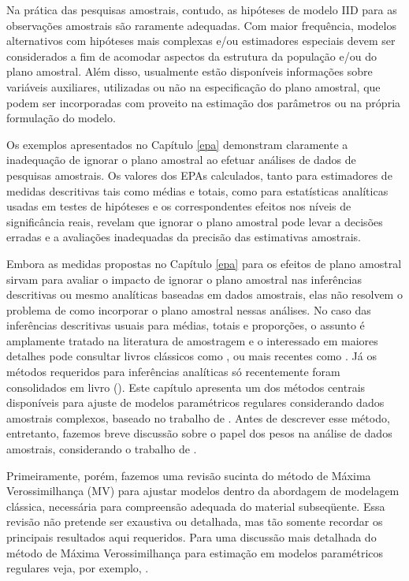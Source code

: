 \documentclass[]{book}
\theoremstyle{definition}
\theoremstyle{definition}
\theoremstyle{definition}
\theoremstyle{remark}
\begin{document}
Na prática das pesquisas amostrais, contudo, as hipóteses de modelo IID
para as observações amostrais são raramente adequadas. Com maior
frequência, modelos alternativos com hipóteses mais complexas e/ou
estimadores especiais devem ser considerados a fim de acomodar aspectos
da estrutura da população e/ou do plano amostral. Além disso, usualmente
estão disponíveis informações sobre variáveis auxiliares, utilizadas ou
não na especificação do plano amostral, que podem ser incorporadas com
proveito na estimação dos parâmetros ou na própria formulação do modelo.

Os exemplos apresentados no Capítulo \ref{epa} demonstram claramente a
inadequação de ignorar o plano amostral ao efetuar análises de dados de
pesquisas amostrais. Os valores dos EPAs calculados, tanto para
estimadores de medidas descritivas tais como médias e totais, como para
estatísticas analíticas usadas em testes de hipóteses e os
correspondentes efeitos nos níveis de significância reais, revelam que
ignorar o plano amostral pode levar a decisões erradas e a avaliações
inadequadas da precisão das estimativas amostrais.

Embora as medidas propostas no Capítulo \ref{epa} para os efeitos de
plano amostral sirvam para avaliar o impacto de ignorar o plano amostral
nas inferências descritivas ou mesmo analíticas baseadas em dados
amostrais, elas não resolvem o problema de como incorporar o plano
amostral nessas análises. No caso das inferências descritivas usuais
para médias, totais e proporções, o assunto é amplamente tratado na
literatura de amostragem e o interessado em maiores detalhes pode
consultar livros clássicos como \citep{cochran}, ou mais recentes como
\citep{SSW92}. Já os métodos requeridos para inferências analíticas só
recentemente foram consolidados em livro (\citep{SHS89}). Este capítulo
apresenta um dos métodos centrais disponíveis para ajuste de modelos
paramétricos regulares considerando dados amostrais complexos, baseado
no trabalho de \citep{binder87}. Antes de descrever esse método,
entretanto, fazemos breve discussão sobre o papel dos pesos na análise
de dados amostrais, considerando o trabalho de \citep{Pfeff}.

Primeiramente, porém, fazemos uma revisão sucinta do método de Máxima
Verossimilhança (MV) para ajustar modelos dentro da abordagem de
modelagem clássica, necessária para compreensão adequada do material
subseqüente. Essa revisão não pretende ser exaustiva ou detalhada, mas
tão somente recordar os principais resultados aqui requeridos. Para uma
discussão mais detalhada do método de Máxima Verossimilhança para
estimação em modelos paramétricos regulares veja, por exemplo,
\citep{garthwaite}.
\end{document}
